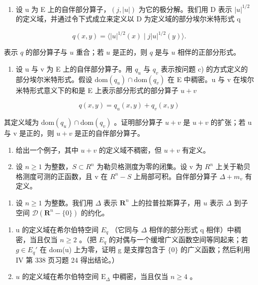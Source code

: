 \begin{enumerate}
\def\labelenumi{\alph{enumi})}
\setcounter{enumi}{2}
\tightlist
\item
  设 u 为 E 上的自伴部分算子，\((j, |u|)\) 为它的极分解。我们用 D 表示 \(|u|^{1/2}\) 的定义域，并通过令下式成立来定义以 D 为定义域的部分埃尔米特形式 q
\end{enumerate}

\[
q (x, y) = \langle | u | ^ {1 / 2} (x) \mid j | u | ^ {1 / 2} (y) \rangle .
\]

表示 \(q\) 的部分算子与 \(u\) 重合；若 \(u\) 是正的，则 \(q\) 是与 \(u\) 相伴的正部分形式。

\begin{enumerate}
\def\labelenumi{\alph{enumi})}
\setcounter{enumi}{3}
\tightlist
\item
  设 u 与 v 为 E 上的自伴部分算子。用 \(q_{u}\) 与 \(q_{v}\) 表示按问题 c) 的方式定义的部分埃尔米特形式。假设 \(\text{dom}(q_{u}) \cap \text{dom}(q_{v})\) 在 E 中稠密。u 与 v 在埃尔米特形式意义下的和是 E 上表示部分形式的部分算子 \(u + v\)
\end{enumerate}

\[
q (x, y) = q _ {u} (x, y) + q _ {v} (x, y)
\]

其定义域为 \(\mathrm{dom}(q_{u})\cap\mathrm{dom}(q_{v})\) 。证明部分算子 \(u+v\) 是 \(u+v\) 的扩张；若 u 与 v 是正的，则 \(u+v\) 是正的自伴部分算子。

\begin{enumerate}
\def\labelenumi{\alph{enumi})}
\setcounter{enumi}{4}
\item
  给出一个例子，其中 \(u + v\) 的定义域不稠密，但 \(u + v\) 有定义。
\item
  设 \(n \geqslant 1\) 为整数，\(S \subset R^{n}\) 为勒贝格测度为零的闭集。设 v 为 \(R^{n}\) 上关于勒贝格测度可测的正函数，且 v 在 \(R^{n}-S\) 上局部可积。自伴部分算子 \(\Delta + m_{v}\) 有定义。
\end{enumerate}

\begin{enumerate}
\def\labelenumi{\arabic{enumi})}
\setcounter{enumi}{40}
\tightlist
\item
  设 \(n \geqslant 1\) 为整数。我们用 \(\Delta\) 表示 \(\mathbf{R}^n\) 上的拉普拉斯算子，用 \(u\) 表示 \(\Delta\) 到子空间 \(\mathcal{D}(\mathbf{R}^n - \{0\})\) 的约化。
\end{enumerate}

\begin{enumerate}
\def\labelenumi{\alph{enumi})}
\item
  u 的定义域在希尔伯特空间 \(E_{q}\) （它同与 \(\Delta\) 相伴的部分形式 q 相伴）中稠密，当且仅当 \(n \geqslant 2\) 。（把 \(E_{q}\) 的对偶与一个缓增广义函数空间等同起来；若 \(g \in E_{q}'\) 在 dom(u) 上为零，证明 g 是支撑包含于 \(\{0\}\) 的广义函数；然后利用 IV 第 338 页习题 24 得出结论。）
\item
  \(u\) 的定义域在希尔伯特空间 \(\mathrm{E}_{\Delta}\) 中稠密，当且仅当 \(n \geqslant 4\) 。
\end{enumerate}

